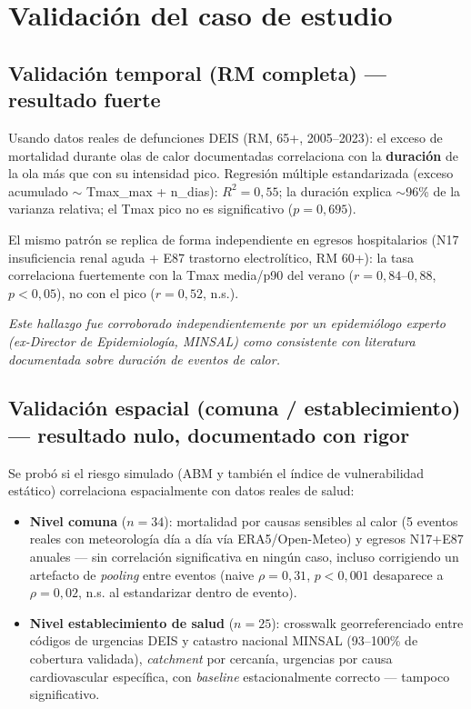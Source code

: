 \documentclass[11pt,a4paper]{article}
\begin{document}
\section{Validación del caso de estudio}

\subsection{Validación temporal (RM completa) --- resultado fuerte}

Usando datos reales de defunciones DEIS (RM, 65+, 2005--2023): el exceso de
mortalidad durante olas de calor documentadas correlaciona con la
\textbf{duración} de la ola más que con su intensidad pico. Regresión
múltiple estandarizada (exceso acumulado $\sim$ Tmax\_max + n\_dias):
$R^2=0{,}55$; la duración explica $\sim$96\% de la varianza relativa; el
Tmax pico no es significativo ($p=0{,}695$).

El mismo patrón se replica de forma independiente en egresos hospitalarios
(N17 insuficiencia renal aguda + E87 trastorno electrolítico, RM 60+): la
tasa correlaciona fuertemente con la Tmax media/p90 del verano
($r=0{,}84$--$0{,}88$, $p<0{,}05$), no con el pico ($r=0{,}52$, n.s.).

\textit{Este hallazgo fue corroborado independientemente por un
epidemiólogo experto (ex-Director de Epidemiología, MINSAL) como
consistente con literatura documentada sobre duración de eventos de calor.}

\subsection{Validación espacial (comuna / establecimiento) --- resultado nulo, documentado con rigor}

Se probó si el riesgo simulado (ABM y también el índice de vulnerabilidad
estático) correlaciona espacialmente con datos reales de salud:

\begin{itemize}[leftmargin=*]
    \item \textbf{Nivel comuna} ($n=34$): mortalidad por causas sensibles al
        calor (5 eventos reales con meteorología día a día vía
        ERA5/Open-Meteo) y egresos N17+E87 anuales --- sin correlación
        significativa en ningún caso, incluso corrigiendo un artefacto de
        \emph{pooling} entre eventos (naive $\rho=0{,}31$, $p<0{,}001$
        desaparece a $\rho=0{,}02$, n.s. al estandarizar dentro de evento).
    \item \textbf{Nivel establecimiento de salud} ($n=25$): crosswalk
        georreferenciado entre códigos de urgencias DEIS y catastro nacional
        MINSAL (93--100\% de cobertura validada), \emph{catchment} por
        cercanía, urgencias por causa cardiovascular específica, con
        \emph{baseline} estacionalmente correcto --- tampoco significativo.
\end{itemize}
\end{document}
